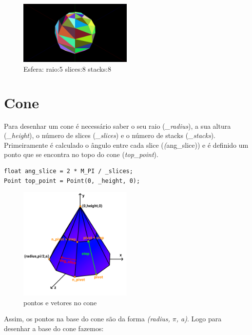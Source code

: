 \documentclass[a4paper]{report}
\begin{document}


\begin{figure}[H]
    \centering 
    \includegraphics[width=0.5\textwidth]{images/sphere.png}  
    \caption{Esfera: raio:5 slices:8 stacks:8}
    \label{fig:cilindro_render}
\end{figure}


\section{Cone}
Para desenhar um cone é necessário saber o seu raio (\textit{\_radius}), a sua
altura (\textit{\_height}), o número de slices (\textit{\_slices}) e o número de
stacks (\textit{\_stacks}).\\
Primeiramente é calculado o ângulo entre cada slice (\textit(ang\_slice))
e é definido um ponto que se encontra no topo do cone (\textit{top\_point}).

\begin{lstlisting}
float ang_slice = 2 * M_PI / _slices;
Point top_point = Point(0, _height, 0);
\end{lstlisting}
\begin{figure}[H]
    \centering 
    \includegraphics[width=0.5\textwidth]{images/cone_vetores.png}  
    \caption{pontos e vetores no cone}
    \label{fig:cone_vetores}
\end{figure}
Assim, os pontos na base do cone são da forma \textit{(radius, $\pi$, a)}.
Logo para desenhar a base do cone fazemos:
\end{document}
